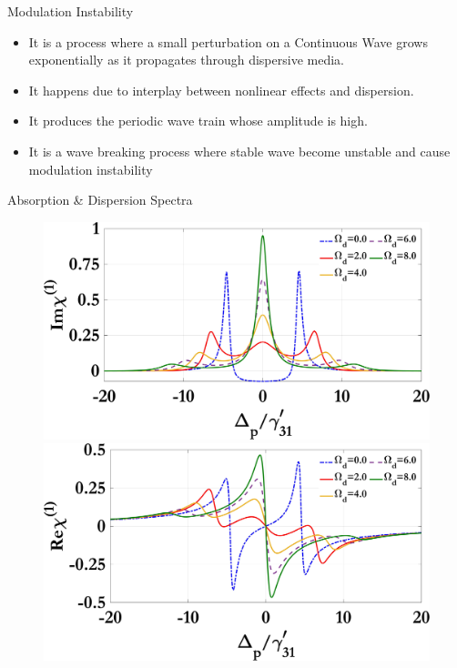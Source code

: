 \documentclass[12pt,aspectratio=1610]{beamer}
\begin{document}
\begin{frame}{Modulation Instability}
  \begin{itemize}
    \item It is a process where a small perturbation on a Continuous Wave grows exponentially as it propagates through dispersive media.
    \item It happens due to interplay between nonlinear effects and dispersion.
    \item It produces the periodic wave train whose amplitude is high.
    \item It is a wave breaking process where stable wave become unstable and cause modulation instability
  \end{itemize}
\end{frame}

\begin{frame}{Absorption \& Dispersion Spectra}
  \vspace{-22pt}
  \begin{figure}[h]
    \centering
    \begin{minipage}{0.48\textwidth}
      \centering
      \includegraphics[width=\linewidth]{Assets/Img_chi1_Omega_d.jpeg}
      \subcaption{}
    \end{minipage}
    \hfill
    \begin{minipage}{0.48\textwidth}
      \centering
      \includegraphics[width=\linewidth]{Assets/Real_chi1_Omega_d.jpeg}

\end{minipage}
\end{figure}
\end{frame}
\end{document}
